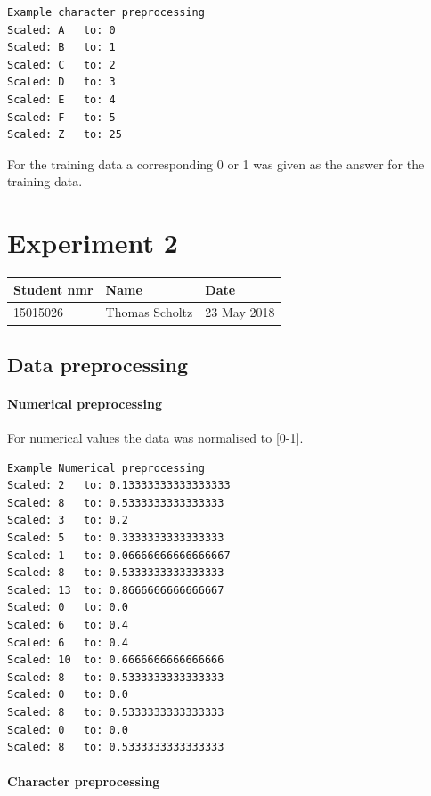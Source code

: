 \documentclass[11pt]{article}
\begin{document}
\begin{verbatim}
Example character preprocessing
Scaled: A   to: 0
Scaled: B   to: 1
Scaled: C   to: 2
Scaled: D   to: 3
Scaled: E   to: 4
Scaled: F   to: 5
Scaled: Z   to: 25
\end{verbatim}

For the training data a corresponding 0 or 1 was given as the answer for
the training data.

    \hypertarget{experiment-2}{%
\section{Experiment 2}\label{experiment-2}}

\begin{longtable}[]{@{}lll@{}}
\toprule
Student nmr & Name & Date\tabularnewline
\midrule
\endhead
15015026 & Thomas Scholtz & 23 May 2018\tabularnewline
\bottomrule
\end{longtable}

    \hypertarget{data-preprocessing}{%
\subsection{Data preprocessing}\label{data-preprocessing}}

\hypertarget{numerical-preprocessing}{%
\paragraph{Numerical preprocessing}\label{numerical-preprocessing}}

For numerical values the data was normalised to {[}0-1{]}.

\begin{verbatim}
Example Numerical preprocessing
Scaled: 2   to: 0.13333333333333333
Scaled: 8   to: 0.5333333333333333
Scaled: 3   to: 0.2
Scaled: 5   to: 0.3333333333333333
Scaled: 1   to: 0.06666666666666667
Scaled: 8   to: 0.5333333333333333
Scaled: 13  to: 0.8666666666666667
Scaled: 0   to: 0.0
Scaled: 6   to: 0.4
Scaled: 6   to: 0.4
Scaled: 10  to: 0.6666666666666666
Scaled: 8   to: 0.5333333333333333
Scaled: 0   to: 0.0
Scaled: 8   to: 0.5333333333333333
Scaled: 0   to: 0.0
Scaled: 8   to: 0.5333333333333333
\end{verbatim}

\hypertarget{character-preprocessing}{%
\paragraph{Character preprocessing}\label{character-preprocessing}}
\end{document}
